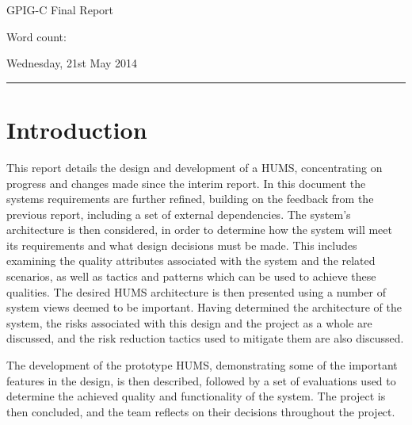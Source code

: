 \documentclass[10pt,a4paper]{article}
\begin{document}
\begin{center}
{\vspace*{-0.5cm}
\Huge GPIG-C Final Report}
\vspace*{0.2cm}

Word count: %
\vspace*{0.1cm}

Wednesday, 21st May 2014
\end{center}
\vspace*{0.4cm}
\hrule
\vspace*{0.4cm}

\section{Introduction}
\label{sec:intro}
This report details the design and development of a HUMS, concentrating on progress and changes made since the interim report. In this document the systems requirements are further refined, building on the feedback from the previous report, including a set of external dependencies. The system's architecture is then considered, in order to determine how the system will meet its requirements and what design decisions must be made. This includes examining the quality attributes associated with the system and the related scenarios, as well as tactics and patterns which can be used to achieve these qualities. The desired HUMS architecture is then presented using a number of system views deemed to be important. Having determined the architecture of the system, the risks associated with this design and the project as a whole are discussed, and the risk reduction tactics used to mitigate them are also discussed.

The development of the prototype HUMS, demonstrating some of the important features in the design, is then described, followed by a set of evaluations used to determine the achieved quality and functionality of the system. The project is then concluded, and the team reflects on their decisions throughout the project.

\end{document}
